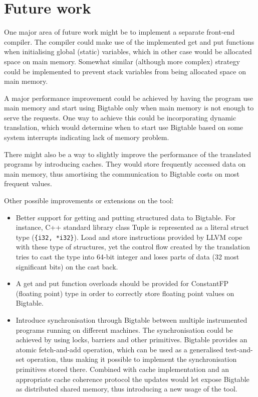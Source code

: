 \documentclass[bsc,frontabs,twoside,singlespacing,parskip,deptreport]{infthesis}     %
\begin{document}
\section{Future work}

One major area of future work might be to implement a separate front-end compiler. The compiler could make use of the implemented get and put functions when initialising global (static) variables, which in other case would be allocated space on main memory. Somewhat similar (although more complex) strategy could be implemented to prevent stack variables from being allocated space on main memory.

A major performance improvement could be achieved by having the program use main memory and start using Bigtable only when main memory is not enough to serve the requests. One way to achieve this could be incorporating dynamic translation, which would determine when to start use Bigtable based on some system interrupts indicating lack of memory problem. 

There might also be a way to slightly improve the performance of the translated programs by introducing caches. They would store frequently accessed data on main memory, thus amortising the communication to Bigtable costs on most frequent values.

Other possible improvements or extensions on the tool:
\begin{itemize}
\item
Better support for getting and putting structured data to Bigtable. For instance, C++ standard library class Tuple is represented as a literal struct type (\texttt{\{i32, *i32\}}). Load and store instructions provided by LLVM cope with these type of structures, yet the control flow created by the translation tries to cast the type into 64-bit integer and loses parts of data (32 most significant bits) on the cast back. 
\item
A get and put function overloads should be provided for ConstantFP (floating point) type in order to correctly store floating point values on Bigtable.
\item
Introduce synchronisation through Bigtable between multiple instrumented programs running on different machines. The synchronisation could be achieved by using locks, barriers and other primitives. Bigtable provides an atomic fetch-and-add operation, which can be used as a generalised test-and-set operation, thus making it possible to implement the synchronisation primitives stored there. Combined with cache implementation and an appropriate cache coherence protocol the updates would let expose Bigtable as distributed shared memory, thus introducing a new usage of the tool.
\end{itemize}
\end{document}

